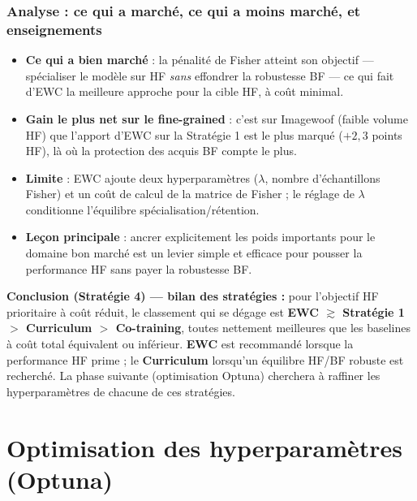 \documentclass[11pt,a4paper,openany]{book}
\begin{document}
\subsection{Analyse : ce qui a marché, ce qui a moins marché, et enseignements}

\begin{itemize}
  \item \textbf{Ce qui a bien marché} : la pénalité de Fisher atteint son objectif — spécialiser le modèle sur HF \emph{sans} effondrer la robustesse BF — ce qui fait d'EWC la meilleure approche pour la cible HF, à coût minimal.
  \item \textbf{Gain le plus net sur le fine-grained} : c'est sur Imagewoof (faible volume HF) que l'apport d'EWC sur la Stratégie 1 est le plus marqué ($+2,3$ points HF), là où la protection des acquis BF compte le plus.
  \item \textbf{Limite} : EWC ajoute deux hyperparamètres ($\lambda$, nombre d'échantillons Fisher) et un coût de calcul de la matrice de Fisher ; le réglage de $\lambda$ conditionne l'équilibre spécialisation/rétention.
  \item \textbf{Leçon principale} : ancrer explicitement les poids importants pour le domaine bon marché est un levier simple et efficace pour pousser la performance HF sans payer la robustesse BF.
\end{itemize}

\begin{decisionbox}
  \textbf{Conclusion (Stratégie 4) — bilan des stratégies :} pour l'objectif HF prioritaire à coût réduit, le classement qui se dégage est \textbf{EWC $\gtrsim$ Stratégie 1 $>$ Curriculum $>$ Co-training}, toutes nettement meilleures que les baselines à coût total équivalent ou inférieur. \textbf{EWC} est recommandé lorsque la performance HF prime ; le \textbf{Curriculum} lorsqu'un équilibre HF/BF robuste est recherché. La phase suivante (optimisation Optuna) cherchera à raffiner les hyperparamètres de chacune de ces stratégies.
\end{decisionbox}

\chapter{Optimisation des hyperparamètres (Optuna)}
\end{document}
